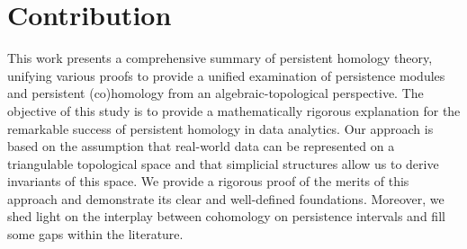 \section{Contribution}
This work presents a comprehensive summary of persistent homology theory, unifying various proofs to provide a unified examination of persistence modules and persistent (co)homology from an algebraic-topological perspective. The objective of this study is to provide a mathematically rigorous explanation for the remarkable success of persistent homology in data analytics. Our approach is based on the assumption that real-world data can be represented on a triangulable topological space and that simplicial structures allow us to derive invariants of this space. We provide a rigorous proof of the merits of this approach and demonstrate its clear and well-defined foundations. Moreover, we shed light on the interplay between cohomology on persistence intervals and fill some gaps within the literature.